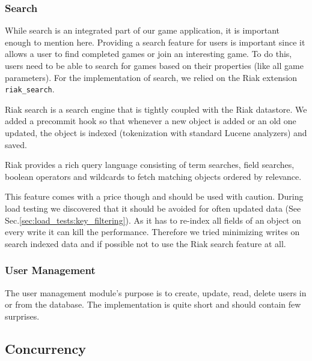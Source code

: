 \documentclass[11pt,a4paper]{report}
\begin{document}
\subsubsection{Search}\label{sec:backend:search}
While search is an integrated part of our game application, it is important
enough to mention here. Providing a search feature for users is important since
it allows a user to find completed games or join an interesting game. To do
this, users need to be able to search for games based on their properties (like
all game parameters). For the implementation of search, we relied on the Riak
extension {\tt riak\_search}.

Riak search is a search engine that is tightly coupled with the Riak datastore.
We added a precommit hook so that whenever a new object is added or an old one
updated, the object is indexed (tokenization with standard Lucene analyzers)
and saved.

Riak provides a rich query language consisting of term searches, field searches,
boolean operators and wildcards to fetch matching objects ordered by relevance.

This feature comes with a price though and should be used with caution.
During load testing we discovered that it should be avoided for often updated
data (See Sec.\ref{sec:load_tests:key_filtering}).
As it has to re-index all fields of an object on every write it can kill the
performance.
Therefore we tried minimizing writes on search indexed data and if possible not
to use the Riak search feature at all.

\subsubsection{User Management}
The user management module's purpose is to create, update, read, delete users
in or from the database. The implementation is quite short and should contain
few surprises.

\subsection{Concurrency}
\label{sec:concurrency}
\end{document}
